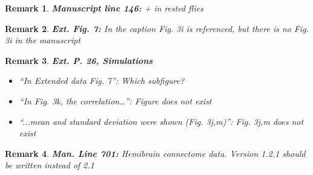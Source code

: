 \documentclass[11pt]{article}
\theoremstyle{questionstyle}
\theoremstyle{defaultstyle}
\newtheorem{remark}{Remark}
\begin{document}
\begin{remark}
    \textbf{Manuscript line 146:} + in rested flies
\end{remark}

\begin{remark}
    \textbf{Ext. Fig. 7:} In the caption Fig. 3i is referenced, but there is no Fig. 3i in the manuscript
\end{remark}

\begin{remark}
    \textbf{Ext. P. 26, Simulations}
    \begin{itemize}
        \item “In Extended data Fig. 7”: Which subfigure?
        \item “In Fig. 3k, the correlation…”: Figure does not exist
        \item “...mean and standard deviation were shown (Fig. 3j,m)”: Fig. 3j,m does not exist
    \end{itemize}
\end{remark}

\begin{remark}
    \textbf{Man. Line 701:} Hemibrain connectome data. Version 1.2.1 should be written instead of 2.1
\end{remark}
\end{document}
